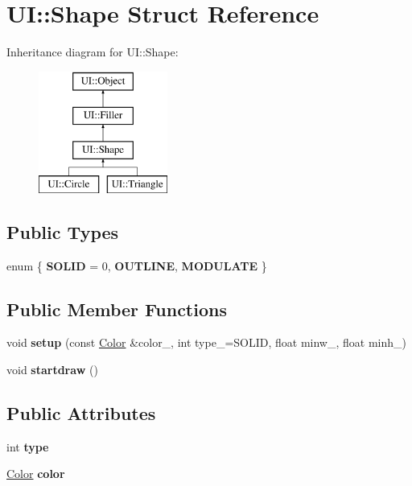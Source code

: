 \hypertarget{struct_u_i_1_1_shape}{}\section{UI\+:\+:Shape Struct Reference}
\label{struct_u_i_1_1_shape}
Inheritance diagram for UI\+:\+:Shape\+:\begin{figure}[H]
\begin{center}
\leavevmode
\includegraphics[height=4.000000cm]{struct_u_i_1_1_shape}
\end{center}
\end{figure}
\subsection*{Public Types}
\begin{DoxyCompactItemize}
\item 
\mbox{\label{struct_u_i_1_1_shape_ac179b9fe4a5088dbb96cb251c96fb35d}} 
enum \{ {\bfseries S\+O\+L\+ID} = 0, 
{\bfseries O\+U\+T\+L\+I\+NE}, 
{\bfseries M\+O\+D\+U\+L\+A\+TE}
 \}
\end{DoxyCompactItemize}
\subsection*{Public Member Functions}
\begin{DoxyCompactItemize}
\item 
\mbox{\label{struct_u_i_1_1_shape_ab0f201392996d88d056083aabe35258d}} 
void {\bfseries setup} (const \hyperlink{struct_u_i_1_1_color}{Color} \&color\+\_\+, int type\+\_\+=S\+O\+L\+ID, float minw\+\_, float minh\+\_)
\item 
\mbox{\label{struct_u_i_1_1_shape_a1120c78305c8bc3a5badc062a1d05ebf}} 
void {\bfseries startdraw} ()
\end{DoxyCompactItemize}
\subsection*{Public Attributes}
\begin{DoxyCompactItemize}
\item 
\mbox{\label{struct_u_i_1_1_shape_a7c3e34e1ddb0bdf091e7053755cf6d22}} 
int {\bfseries type}
\item 
\mbox{\label{struct_u_i_1_1_shape_accbb19065edbc651394c96010b2011a0}} 
\hyperlink{struct_u_i_1_1_color}{Color} {\bfseries color}
\end{DoxyCompactItemize}
